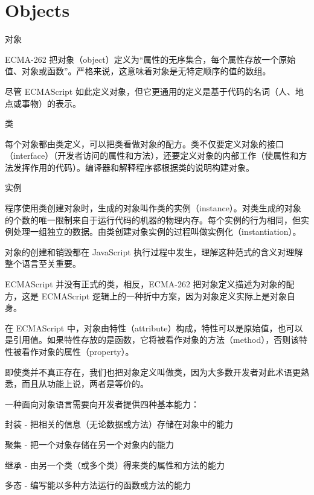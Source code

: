 \part{Objects}


\begin{compactitem}
\item 对象

ECMA-262 把对象（object）定义为“属性的无序集合，每个属性存放一个原始值、对象或函数”。严格来说，这意味着对象是无特定顺序的值的数组。

尽管 ECMAScript 如此定义对象，但它更通用的定义是基于代码的名词（人、地点或事物）的表示。

\item 类

每个对象都由类定义，可以把类看做对象的配方。类不仅要定义对象的接口（interface）（开发者访问的属性和方法），还要定义对象的内部工作（使属性和方法发挥作用的代码）。编译器和解释程序都根据类的说明构建对象。


\item 实例

程序使用类创建对象时，生成的对象叫作类的实例（instance）。对类生成的对象的个数的唯一限制来自于运行代码的机器的物理内存。每个实例的行为相同，但实例处理一组独立的数据。由类创建对象实例的过程叫做实例化（instantiation）。

对象的创建和销毁都在 JavaScript 执行过程中发生，理解这种范式的含义对理解整个语言至关重要。


\end{compactitem}


ECMAScript 并没有正式的类，相反，ECMA-262 把对象定义描述为对象的配方，这是 ECMAScript 逻辑上的一种折中方案，因为对象定义实际上是对象自身。

在 ECMAScript 中，对象由特性（attribute）构成，特性可以是原始值，也可以是引用值。如果特性存放的是函数，它将被看作对象的方法（method），否则该特性被看作对象的属性（property）。

即使类并不真正存在，我们也把对象定义叫做类，因为大多数开发者对此术语更熟悉，而且从功能上说，两者是等价的。


一种面向对象语言需要向开发者提供四种基本能力：

\begin{compactenum}
\item 封装 - 把相关的信息（无论数据或方法）存储在对象中的能力
\item 聚集 - 把一个对象存储在另一个对象内的能力
\item 继承 - 由另一个类（或多个类）得来类的属性和方法的能力
\item 多态 - 编写能以多种方法运行的函数或方法的能力
\end{compactenum}

